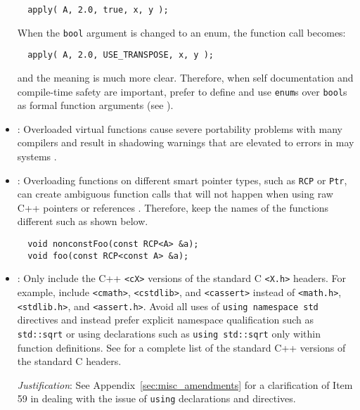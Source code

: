 \begin{itemize}
{\small\begin{verbatim}
  apply( A, 2.0, true, x, y );\end{verbatim}}

When the \texttt{bool} argument is changed to an enum, the function call
becomes:

{\small\begin{verbatim}
  apply( A, 2.0, USE_TRANSPOSE, x, y );
\end{verbatim}}

and the meaning is much more clear.  Therefore, when self
documentation and compile-time safety are important, prefer to define
and use \texttt{enum}s over \texttt{bool}s as formal function
arguments (see \cite[Section 12.6]{CodeComplete2nd04}).

\item\GCGOverloadedVirtualFunctions: Overloaded virtual functions
  cause severe portability problems with many compilers and result in
  shadowing warnings that are elevated to errors in may systems
  \cite[Item 33]{EffectiveC++3rd05}.

\item\GCGAvoidSmartPtrFuncOverloads: Overloading functions on
  different smart pointer types, such as \texttt{RCP} or \texttt{Ptr},
  can create ambiguous function calls that will not happen when using
  raw C++ pointers or references \cite{TeuchosMemoryManagementGuide}.
  Therefore, keep the names of the functions different such as shown
  below.

{\small\begin{verbatim}
  void nonconstFoo(const RCP<A> &a);
  void foo(const RCP<const A> &a);
\end{verbatim}}


\item\GCGStandardCppHeaders: Only include the C++ \texttt{<cX>}
  versions of the standard C \texttt{<X.h>} headers.  For example,
  include \texttt{<cmath>}, \texttt{<cstdlib>}, and \texttt{<cassert>}
  instead of \texttt{<math.h>}, \texttt{<stdlib.h>}, and
  \texttt{<assert.h>}.  Avoid all uses of \texttt{using namespace std}
  directives and instead prefer explicit namespace qualification such
  as \texttt{std::sqrt} or using declarations such as \texttt{using
    std::sqrt} only within function definitions.  See \cite[Section
  16.1.2]{stroustrup97} for a complete list of the standard C++
  versions of the standard C headers.

  \textit{Justification}: See Appendix~\ref{sec:misc_amendments} for a
  clarification of Item 59 in \cite{C++CodingStandards05} dealing
  with the issue of \texttt{using} declarations and directives.



\end{itemize}
